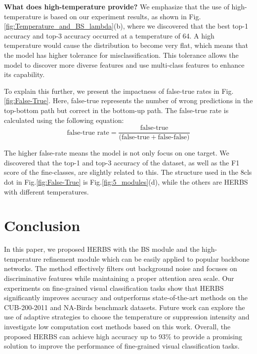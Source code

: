 \documentclass[journal]{IEEEtran}
\begin{document}
\textbf{What does high-temperature provide?} We emphasize that the use of high-temperature is based on our experiment results, as shown in Fig.\ref{fig:Temperature_and_BS_lambda}(b), where we discovered that the best top-1 accuracy and top-3 accuracy occurred at a temperature of 64. A high temperature would cause the distribution to become very flat, which means that the model has higher tolerance for misclassification. This tolerance allows the model to discover more diverse features and use multi-class features to enhance its capability. 

To explain this further, we present the impactness of false-true rates in Fig.\ref{fig:False-True}. Here, false-true represents the number of wrong predictions in the top-bottom path but correct in the bottom-up path. The false-true rate is calculated using the following equation:
\begin{equation} \label{eq:herbs_loss}
\text{false-true rate} = \frac{\text{false-true}}{(\text{false-true} + \text{false-false)}}
\end{equation}

The higher false-rate means the model is not only focus on one target. We discovered that the top-1 and top-3 accuracy of the dataset, as well as the F1 score of the fine-classes, are slightly related to this. The structure used in the 8cls dot in Fig.\ref{fig:False-True} is Fig.\ref{fig:5_modules}(d), while the others are HERBS with different temperatures.

\section{Conclusion}
In this paper, we proposed HERBS with the BS module and the high-temperature refinement module which can be easily applied to popular backbone networks. The method effectively filters out background noise and focuses on discriminative features while maintaining a proper attention area scale. Our experiments on fine-grained visual classification tasks show that HERBS significantly improves accuracy and outperforms state-of-the-art methods on the CUB-200-2011 and NA-Birds benchmark datasets. Future work can explore the use of adaptive strategies to choose the temperature or suppression intensity and investigate low computation cost methods based on this work. Overall, the proposed HERBS can achieve high accuracy up to 93\% to provide a promising solution to improve the performance of fine-grained visual classification tasks.

{\small


}
\end{document}
